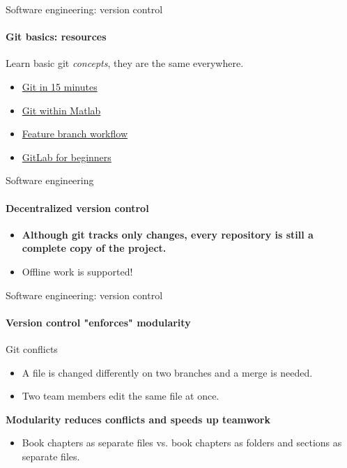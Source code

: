 \begin{frame}{Software engineering: version control}
    \framesubtitle{Git basics: resources}
    \vfill

    Learn basic git \emph{concepts}, they are the same everywhere.  
    \begin{itemize}
        \item \href{https://www.youtube.com/watch?v=USjZcfj8yxE}{Git in 15 minutes} 
        \item \href{https://de.mathworks.com/help/matlab/source-control.html}{Git within Matlab}
        \item \href{https://www.atlassian.com/git/tutorials/comparing-workflows/feature-branch-workflow}{Feature branch workflow}
        \item \href{https://www.youtube.com/watch?v=Jt4Z1vwtXT0}{GitLab for beginners}
    \end{itemize}

\end{frame}

\begin{frame}{Software engineering}
    \framesubtitle{Decentralized version control}

    \vfill
    \centering
    \resizebox{.35\textwidth}{!}{\unskip}

    \begin{itemize}
        \item \textbf{Although git tracks only changes, every repository is still a complete copy of the project.}
        \item Offline work is supported!  
    \end{itemize}

\end{frame}

\begin{frame}{Software engineering: version control}
    \framesubtitle{Version control "enforces" modularity}

    \vfill

    Git conflicts 
    \begin{itemize}
        \item A file is changed differently on two branches and a merge is needed.
        \item Two team members edit the same file at once. 
    \end{itemize}

    \textbf{Modularity reduces conflicts and speeds up teamwork}
    \begin{itemize}
        \item Book chapters as separate files vs. book chapters as folders and sections as separate files.
    \end{itemize}

\end{frame}

